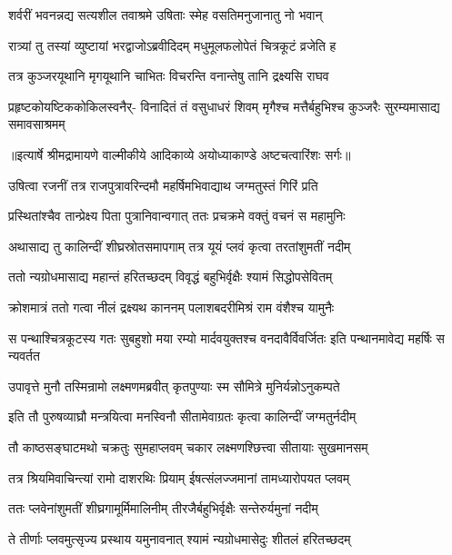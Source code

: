 \twolineshloka
{शर्वरीं भवनन्नद्य सत्यशील तवाश्रमे}
{उषिताः स्मेह वसतिमनुजानातु नो भवान्} %

\twolineshloka
{रात्र्यां तु तस्यां व्युष्टायां भरद्वाजोऽब्रवीदिदम्}
{मधुमूलफलोपेतं चित्रकूटं व्रजेति ह} %

\twolineshloka
{तत्र कुञ्जरयूथानि मृगयूथानि चाभितः}
{विचरन्ति वनान्तेषु तानि द्रक्ष्यसि राघव} %

\fourlineindentedshloka
{प्रहृष्टकोयष्टिककोकिलस्वनैर्-}
{विनादितं तं वसुधाधरं शिवम्}
{मृगैश्च मत्तैर्बहुभिश्च कुञ्जरैः}
{सुरम्यमासाद्य समावसाश्रमम्} %


{॥इत्यार्षे श्रीमद्रामायणे वाल्मीकीये आदिकाव्ये अयोध्याकाण्डे अष्टचत्वारिंशः सर्गः॥}


\twolineshloka
{उषित्वा रजनीं तत्र राजपुत्रावरिन्दमौ}
{महर्षिमभिवाद्याथ जग्मतुस्तं गिरिं प्रति} %

\twolineshloka
{प्रस्थितांश्चैव तान्प्रेक्ष्य पिता पुत्रानिवान्वगात्}
{ततः प्रचक्रमे वक्तुं वचनं स महामुनिः} %

\twolineshloka
{अथासाद्य तु कालिन्दीं शीघ्रस्रोतसमापगाम्}
{तत्र यूयं प्लवं कृत्वा तरतांशुमतीं नदीम्} %

\twolineshloka
{ततो न्यग्रोधमासाद्य महान्तं हरितच्छदम्}
{विवृद्धं बहुभिर्वृक्षैः श्यामं सिद्धोपसेवितम्} %

\twolineshloka
{क्रोशमात्रं ततो गत्वा नीलं द्रक्ष्यथ काननम्}
{पलाशबदरीमिश्रं राम वंशैश्च यामुनैः} %

\threelineshloka
{स पन्थाश्चित्रकूटस्य गतः सुबहुशो मया}
{रम्यो मार्दवयुक्तश्च वनदावैर्विवर्जितः}
{इति पन्थानमावेद्य महर्षिः स न्यवर्तत} %

\twolineshloka
{उपावृत्ते मुनौ तस्मिन्रामो लक्ष्मणमब्रवीत्}
{कृतपुण्याः स्म सौमित्रे मुनिर्यन्नोऽनुकम्पते} %

\twolineshloka
{इति तौ पुरुषव्याघ्रौ मन्त्रयित्वा मनस्विनौ}
{सीतामेवाग्रतः कृत्वा कालिन्दीं जग्मतुर्नदीम्} %

\twolineshloka
{तौ काष्ठसङ्घाटमथो चक्रतुः सुमहाप्लवम्}
{चकार लक्ष्मणश्छित्त्वा सीतायाः सुखमानसम्} %

\twolineshloka
{तत्र श्रियमिवाचिन्त्यां रामो दाशरथिः प्रियाम्}
{ईषत्संलज्जमानां तामध्यारोपयत प्लवम्} %

\twolineshloka
{ततः प्लवेनांशुमतीं शीघ्रगामूर्मिमालिनीम्}
{तीरजैर्बहुभिर्वृक्षैः सन्तेरुर्यमुनां नदीम्} %

\twolineshloka
{ते तीर्णाः प्लवमुत्सृज्य प्रस्थाय यमुनावनात्}
{श्यामं न्यग्रोधमासेदुः शीतलं हरितच्छदम्} %

